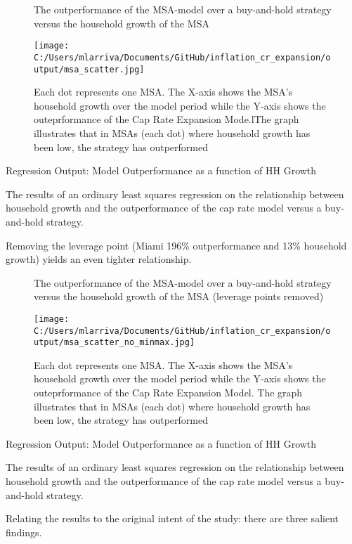 \begin{figure}[H]
\centering
\caption*{The outperformance of the MSA-model over a buy-and-hold strategy versus the household growth of the MSA}
\texttt{[image: C:/Users/mlarriva/Documents/GitHub/inflation\_cr\_expansion/output/msa\_scatter.jpg]}
\caption{Each dot represents one MSA. The X-axis shows the MSA's household growth over the model period while the Y-axis shows the outeprformance of the Cap Rate Expansion Mode.lThe graph illustrates that in MSAs (each dot) where household growth has been low, the strategy has outperformed}
\end{figure}

\begin{table}[H]
\centering
\caption*{Regression Output: Model Outperformance as a function of HH Growth}
\caption{The results of an ordinary least squares regression on the relationship between household growth and the outperformance of the cap rate model versus a buy-and-hold strategy.}
\end{table}
Removing the leverage point (Miami 196\% outperformance and 13\% household growth) yields an even tighter relationship.

\begin{figure}[H]
\centering
\caption*{The outperformance of the MSA-model over a buy-and-hold strategy versus the household growth of the MSA (leverage points removed)}
\texttt{[image: C:/Users/mlarriva/Documents/GitHub/inflation\_cr\_expansion/output/msa\_scatter\_no\_minmax.jpg]}
\caption{Each dot represents one MSA. The X-axis shows the MSA's household growth over the model period while the Y-axis shows the outeprformance of the Cap Rate Expansion Model. The graph illustrates that in MSAs (each dot) where household growth has been low, the strategy has outperformed}
\end{figure}

\begin{table}[H]
\centering
\caption*{Regression Output: Model Outperformance as a function of HH Growth}
\caption{The results of an ordinary least squares regression on the relationship between household growth and the outperformance of the cap rate model versus a buy-and-hold strategy.}
\end{table}

\pagebreak
Relating the results to the original intent of the study: there are three salient findings.

